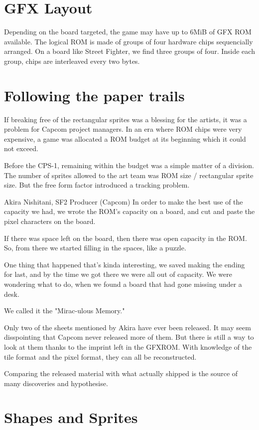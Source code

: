 \section{GFX Layout}
Depending on the board targeted, the game may have up to 6MiB of GFX ROM available. The logical ROM is made of groups of four hardware chips sequencially arranged. On a board like Street Fighter, we find three groups of four. Inside each group, chips are interleaved every two bytes.

\pagebreak

\section{Following the paper trails}
If breaking free of the rectangular sprites was a blessing for the artists, it was a problem for Capcom project managers. In an era where ROM chips were very expensive, a game was allocated a ROM budget at its beginning which it could not exceed.

Before the CPS-1, remaining within the budget was a simple matter of a division. The number of sprites allowed to the art team was ROM size / rectangular sprite size. But the free form factor introduced a tracking problem.

\begin{q}{Akira Nishitani, SF2 Producer (Capcom)}
In order to make the best use of the capacity we had, we wrote the ROM’s capacity on a board, and cut and paste the pixel characters on the board.

If there was space left on the board, then there was open capacity in the ROM. So, from there we started filling in the spaces, like a puzzle.

One thing that happened that's kinda interesting, we saved making the ending for last, and by the time we got there we were all out of capacity. We were wondering what to do, when we found a board that had gone missing under a desk.

We called it the "Mirac-ulous Memory."
\end{q}

Only two of the sheets mentioned by Akira have ever been released\cite{fdasd}\cite{fs}. It may seem disspointing that Capcom never released more of them. But there is still a way to look at them thanks to the imprint left in the GFXROM. With knowledge of the tile format and the pixel format, they can all be reconstructed.


Comparing the released material with what actually shipped is the source of many discoveries and hypothesise. 








\section{Shapes and Sprites}
